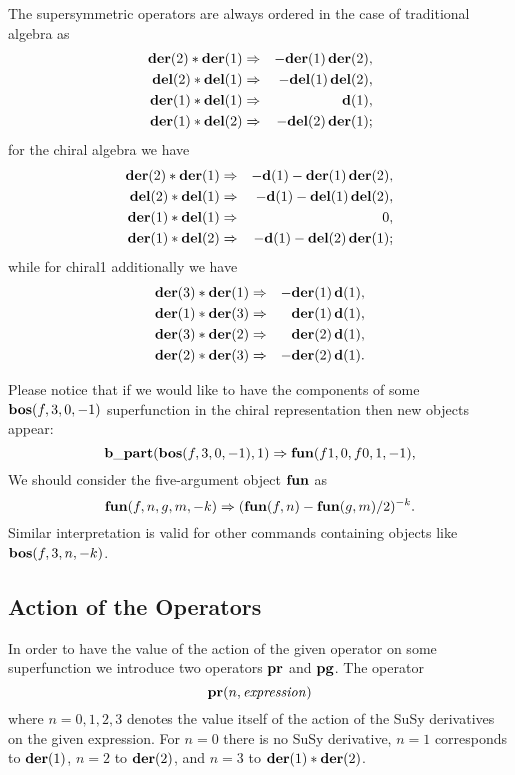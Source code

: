 {The supersymmetric operators are always ordered in the case of
traditional algebra as
\begin{eqnarray*}
  \mathbf{der}(2)*\mathbf{der}(1) &\Rightarrow& -\mathbf{der}(1)\,\mathbf{der}(2),\\
  \mathbf{del}(2)*\mathbf{del}(1) &\Rightarrow& -\mathbf{del}(1)\,\mathbf{del}(2), \\
  \mathbf{der}(1)*\mathbf{del}(1) &\Rightarrow& \mathbf{d}(1), \\
  \mathbf{der}(1)*\mathbf{del}(2) &\Rightarrow& -\mathbf{del}(2)\,\mathbf{der}(1);
\end{eqnarray*}
for the chiral algebra we have
\begin{eqnarray*}
  \mathbf{der}(2)*\mathbf{der}(1) &\Rightarrow& -\mathbf{d}(1) - \mathbf{der}(1)\,\mathbf{der}(2),\\
  \mathbf{del}(2)*\mathbf{del}(1) &\Rightarrow& -\mathbf{d}(1) - \mathbf{del}(1)\,\mathbf{del}(2), \\
  \mathbf{der}(1)*\mathbf{del}(1) &\Rightarrow& 0, \\
  \mathbf{der}(1)*\mathbf{del}(2) &\Rightarrow& -\mathbf{d}(1) - \mathbf{del}(2)\,\mathbf{der}(1);
\end{eqnarray*}
while for chiral1 additionally we have
\begin{eqnarray*}
  \mathbf{der}(3)*\mathbf{der}(1) &\Rightarrow& -\mathbf{der}(1)\,\mathbf{d}(1), \\
  \mathbf{der}(1)*\mathbf{der}(3) &\Rightarrow& \mathbf{der}(1)\,\mathbf{d}(1), \\
  \mathbf{der}(3)*\mathbf{der}(2) &\Rightarrow& \mathbf{der}(2)\,\mathbf{d}(1), \\
  \mathbf{der}(2)*\mathbf{der}(3) &\Rightarrow& -\mathbf{der}(2)\,\mathbf{d}(1).
\end{eqnarray*}

Please notice that if we would like to have the components of some
$\mathbf{bos}(f,3,0,-1)$ superfunction in the chiral representation then new
objects appear:
\begin{equation*}
  \mathbf{b\_part}(\mathbf{bos}(f,3,0,-1), 1)  \Rightarrow \mathbf{fun}(f1,0,f0,1,-1),
\end{equation*}
We should consider the five-argument object $\mathbf{fun}$ as
\begin{equation*}
  \mathbf{fun}(f,n,g,m,-k) \Rightarrow (\mathbf{fun}(f,n)-\mathbf{fun}(g,m)/2)^{-k}.
\end{equation*}
Similar interpretation is valid for other commands containing objects
like $\mathbf{bos}(f,3,n,-k)$.

\subsection{Action of the Operators}

In order to have the value of the action of the given operator on some
superfunction we introduce two operators $\mathbf{pr}$ and $\mathbf{pg}$.  The
operator
\begin{equation*}
  \mathbf{pr}(n,\mathit{expression})
\end{equation*}
where $n=0,1,2,3$ denotes the value itself of the action of the SuSy
derivatives on the given expression.  For $n=0$ there is no SuSy
derivative, $n=1$ corresponds to $\mathbf{der}(1)$, $n=2$ to $\mathbf{der}(2)$, and
$n=3$ to $\mathbf{der}(1)*\mathbf{der}(2)$.

}
